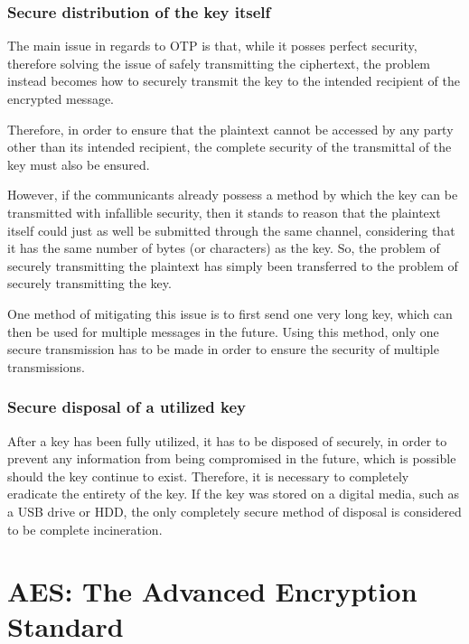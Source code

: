 \documentclass[12pt]{report}
\begin{document}
\subsection{Secure distribution of the key itself}
The main issue in regards to OTP is that, while it posses perfect security, therefore solving the issue of safely transmitting the ciphertext, the problem instead becomes how to securely transmit the key to the intended recipient of the encrypted message.

Therefore, in order to ensure that the plaintext cannot be accessed by any party other than its intended recipient, the complete security of the transmittal of the key must also be ensured.

However, if the communicants already possess a method by which the key can be transmitted with infallible security, then it stands to reason that the plaintext itself could just as well be submitted through the same channel, considering that it has the same number of bytes (or characters) as the key. So, the problem of securely transmitting the plaintext has simply been transferred to the problem of securely transmitting the key.

One method of mitigating this issue is to first send one very long key, which can then be used for multiple messages in the future. Using this method, only one secure transmission has to be made in order to ensure the security of multiple transmissions. 

\subsection{Secure disposal of a utilized key}
After a key has been fully utilized, it has to be disposed of securely, in order to prevent any information from being compromised in the future, which is possible should the key continue to exist. Therefore, it is necessary to completely eradicate the entirety of the key. If the key was stored on a digital media, such as a USB drive or HDD, the only completely secure method of disposal is considered to be complete incineration.


\chapter{AES: The Advanced Encryption Standard}
\end{document}
